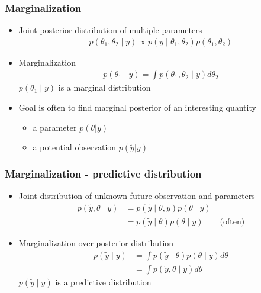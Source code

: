 \documentclass[10pt]{beamer}
\begin{document}
\begin{frame}
\frametitle{Marginalization}

  \begin{itemize}
  \item Joint posterior distribution of multiple parameters
    \begin{align*}
      p(\theta_1,\theta_2 \mid y) \propto p(y \mid \theta_1,\theta_2)p(\theta_1,\theta_2)
    \end{align*}
  \pause
  \item {\color{uured} Marginalization}
      \begin{align*}
        p(\theta_1 \mid y) = \int p(\theta_1,\theta_2 \mid y) d\theta_2
      \end{align*}
      $p(\theta_1 \mid y)$ is a marginal distribution
       \vspace{0.5\baselineskip}
  \pause
 \item Goal is often to find marginal posterior of an interesting quantity
   \begin{itemize}
   \item a {\color{uured} parameter} $p(\theta|y)$
   \item a {\color{uured} potential observation} $p(\tilde{y}|y)$
   \end{itemize}
  \end{itemize}

\end{frame}

\begin{frame}

\frametitle{Marginalization - predictive distribution}

  \begin{itemize}
\item Joint distribution of unknown future observation and parameters
   \begin{align*}
     p(\tilde{y},\theta \mid y) &= p(\tilde{y} \mid \theta,y) p(\theta \mid y)\\
      &= p(\tilde{y} \mid \theta) p(\theta \mid y) \qquad \text{(often)}
   \end{align*}
   \pause
  \item Marginalization over posterior distribution
      \begin{align*}
        p(\tilde{y} \mid y) & = \int p(\tilde{y} \mid \theta)p(\theta \mid y) d\theta\\
         & = \int p(\tilde{y}, \theta \mid y) d\theta
      \end{align*}
      $p(\tilde{y} \mid y)$ is a predictive distribution
  \end{itemize}

\end{frame}
\end{document}
